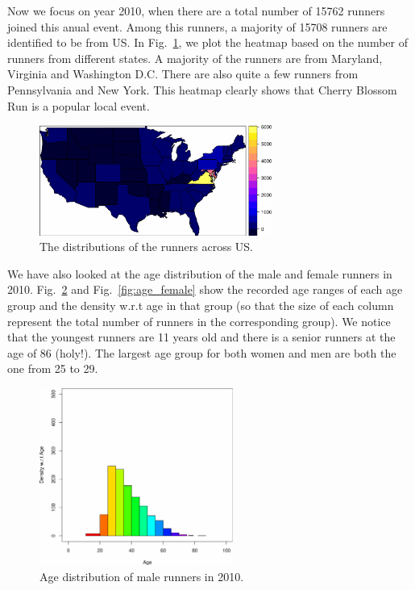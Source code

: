 \documentclass[twocolumn]{article}
\begin{document}
Now we focus on year 2010, when there are a total number of 15762 runners joined
this anual event. Among this runners, a majority of 15708 runners are identified
to be from US. In Fig.~\ref{fig:heatmap}, we plot the heatmap based on the
number of runners from different states. A majority of the runners are from
Maryland, Virginia and Washington D.C. There are also quite a few runners from
Pennsylvania and New York. This heatmap clearly shows that Cherry Blossom Run is
a popular local event.

\begin{figure}[!h]
    \centering
    \includegraphics[width=3in]{figs/heatmap_usa_2010.pdf}
    \caption{The distributions of the runners across US.}
    \label{fig:heatmap}
\end{figure}

We have also looked at the age distribution of the male and female runners in
2010. Fig.~\ref{fig:age_male} and Fig.~\ref{fig:age_female} show the recorded
age ranges of each age group and the density w.r.t age in that group (so that
the size of each column represent the total number of runners in the
corresponding group). We notice that the youngest runners are 11 years old
and there is a senior runners at the age of 86 (holy!). The largest age group
for both women and men are both the one from 25 to 29.

\begin{figure}[!h]
    \centering
    \includegraphics[width=2.5in]{figs/group_m2010.pdf}
    \caption{Age distribution of male runners in 2010.}
    \label{fig:age_male}
\end{figure}
\end{document}
